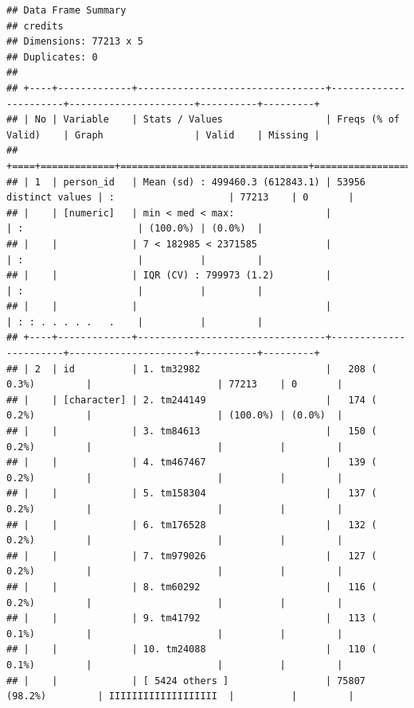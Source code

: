 \documentclass[11pt,preprint]{elsarticle}
\numberwithin{equation}{section}
\numberwithin{figure}{section}
\numberwithin{table}{section}
\begin{document}
\begin{verbatim}
## Data Frame Summary  
## credits  
## Dimensions: 77213 x 5  
## Duplicates: 0  
## 
## +----+-------------+---------------------------------+-----------------------+----------------------+----------+---------+
## | No | Variable    | Stats / Values                  | Freqs (% of Valid)    | Graph                | Valid    | Missing |
## +====+=============+=================================+=======================+======================+==========+=========+
## | 1  | person_id   | Mean (sd) : 499460.3 (612843.1) | 53956 distinct values | :                    | 77213    | 0       |
## |    | [numeric]   | min < med < max:                |                       | :                    | (100.0%) | (0.0%)  |
## |    |             | 7 < 182985 < 2371585            |                       | :                    |          |         |
## |    |             | IQR (CV) : 799973 (1.2)         |                       | :                    |          |         |
## |    |             |                                 |                       | : : . . . . .   .    |          |         |
## +----+-------------+---------------------------------+-----------------------+----------------------+----------+---------+
## | 2  | id          | 1. tm32982                      |   208 ( 0.3%)         |                      | 77213    | 0       |
## |    | [character] | 2. tm244149                     |   174 ( 0.2%)         |                      | (100.0%) | (0.0%)  |
## |    |             | 3. tm84613                      |   150 ( 0.2%)         |                      |          |         |
## |    |             | 4. tm467467                     |   139 ( 0.2%)         |                      |          |         |
## |    |             | 5. tm158304                     |   137 ( 0.2%)         |                      |          |         |
## |    |             | 6. tm176528                     |   132 ( 0.2%)         |                      |          |         |
## |    |             | 7. tm979026                     |   127 ( 0.2%)         |                      |          |         |
## |    |             | 8. tm60292                      |   116 ( 0.2%)         |                      |          |         |
## |    |             | 9. tm41792                      |   113 ( 0.1%)         |                      |          |         |
## |    |             | 10. tm24088                     |   110 ( 0.1%)         |                      |          |         |
## |    |             | [ 5424 others ]                 | 75807 (98.2%)         | IIIIIIIIIIIIIIIIIII  |          |         |

\end{verbatim}
\end{document}
